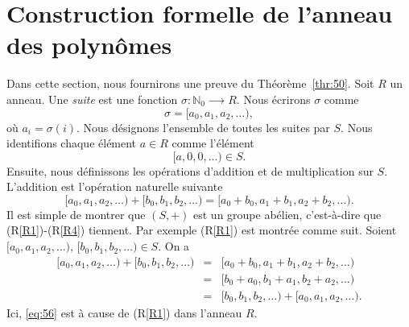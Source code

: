 \section{Construction formelle de l'anneau des polynômes}
\label{sec:form-constr-ring}

Dans cette section, nous fournirons une preuve du Théorème~\ref{thr:50}. Soit $R$ un anneau. Une \emph{suite} est une fonction $σ: ℕ_0 ⟶ R$. Nous écrirons $σ$ comme
\begin{displaymath}
  σ = [a_0,a_1,a_2, \dots ),
\end{displaymath}
où $a_i = σ(i)$. Nous désignons l'ensemble de toutes les suites par $S$.  Nous identifions chaque élément $a ∈R$  comme l'élément
\begin{displaymath}
  [a,0,0, \dots) ∈S. 
\end{displaymath}
%
Ensuite, nous définissons les opérations d'addition et de multiplication sur $S$. L'addition est l'opération naturelle suivante
\begin{displaymath}
  [a_0,a_1,a_2, \dots ) + [b_0,b_1,b_2, \dots ) = [a_0+b_0,a_1+b_1,a_2+b_2, \dots ). 
\end{displaymath}
Il est simple de montrer que $(S,+)$ est un groupe abélien, c'est-à-dire que (R\ref{R1})-(R\ref{R4}) tiennent. Par exemple (R\ref{R1}) est montrée comme suit. Soient $ [a_0,a_1,a_2, \dots ), \, [b_0,b_1,b_2, \dots ) ∈ S$. On a
\begin{eqnarray}
  \label{eq:54}
  [a_0,a_1,a_2, \dots ) +  [b_0,b_1,b_2, \dots )  & = &  [a_0+b_0,a_1+b_1,a_2+b_2, \dots ) \label{eq:55} \\
  & = &        [b_0+a_0,b_1+a_1,b_2+a_2, \dots ) \label{eq:56} \\
  & = & [b_0,b_1,b_2, \dots ) + [a_0,a_1,a_2, \dots ).
\end{eqnarray}
Ici, \eqref{eq:56} est à cause de  (R\ref{R1}) dans l'anneau $R$.

